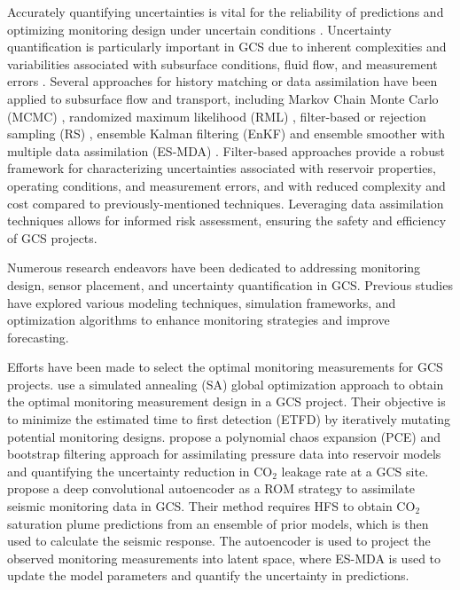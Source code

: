 \documentclass[a4paper,fleqn]{cas-sc}
\begin{document}
Accurately quantifying uncertainties is vital for the reliability of predictions and optimizing monitoring design under uncertain conditions \citep{Zhu2018415, Wang2021, Mohamed201031, Chen2017328, Cremon2020, Bellenfant20092447, Sun2019, Li2011, Nordbotten2012234}. Uncertainty quantification is particularly important in GCS due to inherent complexities and variabilities associated with subsurface conditions, fluid flow, and measurement errors \citep{Jia2018104, Chen2020, Jeong20133771, Jayne2019128}. Several approaches for history matching or data assimilation have been applied to subsurface flow and transport, including Markov Chain Monte Carlo (MCMC) \citep{Emerick2012418, Liu2003188, Chen2016, Chen2017328, Cremon2020}, randomized maximum likelihood (RML) \citep{Chen20121}, filter-based or rejection sampling (RS) \citep{bhark2014assisted, park2013history, ma2008efficient, Caers2011}, ensemble Kalman filtering (EnKF) \citep{Chen2010579, Chang20108011, tavakoli2013comparison, dawuda2022geologic, Ma2019199} and ensemble smoother with multiple data assimilation (ES-MDA) \citep{Rafiee2017, Chen2020, jahandideh2021inference, tadjer2021managing, jiang2021data, liu20213d, misra2022deep}. Filter-based approaches provide a robust framework for characterizing uncertainties associated with reservoir properties, operating conditions, and measurement errors, and with reduced complexity and cost compared to previously-mentioned techniques. Leveraging data assimilation techniques allows for informed risk assessment, ensuring the safety and efficiency of GCS projects. 

Numerous research endeavors have been dedicated to addressing monitoring design, sensor placement, and uncertainty quantification in GCS. Previous studies have explored various modeling techniques, simulation frameworks, and optimization algorithms to enhance monitoring strategies and improve forecasting. 

Efforts have been made to select the optimal monitoring measurements for GCS projects. \citet{Yonkofski2016} use a simulated annealing (SA) global optimization approach to obtain the optimal monitoring measurement design in a GCS project. Their objective is to minimize the estimated time to first detection (ETFD) by iteratively mutating potential monitoring designs. \citet{Oladyshkin2013671} propose a polynomial chaos expansion (PCE) and bootstrap filtering approach for assimilating pressure data into reservoir models and quantifying the uncertainty reduction in CO$_2$ leakage rate at a GCS site. \citet{Liu2020} propose a deep convolutional autoencoder as a ROM strategy to assimilate seismic monitoring data in GCS. Their method requires HFS to obtain CO$_2$ saturation plume predictions from an ensemble of prior models, which is then used to calculate the seismic response. The autoencoder is used to project the observed monitoring measurements into latent space, where ES-MDA is used to update the model parameters and quantify the uncertainty in predictions. 
\end{document}

